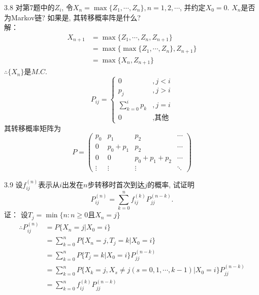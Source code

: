 3.8 对第7题中的$Z_i$, 令$X_n = \max \{Z_1, \cdots , Z_n\}, n = 1, 2, \cdots$, 并约定$X_0 = 0$. $X_n$是否为Markov链? 如果是, 其转移概率阵是什么?\\
解：\\
\begin{align*}
X_{n+1} & = \max \{Z_1, \cdots, Z_n, Z_{n+1}\}\\
		& = \max \{\max\{Z_1, \cdots, Z_n\}, Z_{n+1}\}\\
		& = \max \{X_n, Z_{n+1}\}
\end{align*}
$\therefore \{X_n\}$是$M.C.$\\
\[
P_{ij} = 
\begin{cases}
0 & , j < i\\
p_j & , j > i\\
\sum\limits^i_{k=0}p_k & , j = i\\
0 & , \text{其他}
\end{cases}
\]
其转移概率矩阵为
\[
P = 
\begin{pmatrix}
p_0 & p_1 & p_2 & \cdots \\
0 & p_0+p_1 & p_2 & \cdots \\
0 & 0 & p_0+p_1+p_2 & \cdots \\
\vdots & \vdots & \vdots & \ddots
\end{pmatrix}
\]


3.9 设$f^{(n)}_{ij}$表示从$i$出发在$n$步转移时首次到达$j$的概率, 试证明
\[
P^{(n)}_{ij} = \sum^n_{k=0}f^{(k)}_{ij}P^{(n-k)}_{jj}.
\]
证：
设$T_j = \min \{n: n \geqslant 0 \text{且} X_n = j\}$\\
\[
\begin{split}
\therefore P^{(n)}_{ij} & = P\{X_n = j | X_0 = i\}\\
				& = \sum^n_{k=0}P\{X_n = j, T_j = k | X_0 = i\}\\
				& = \sum^n_{k=0}P\{T_j = k | X_0 = i\}P^{(n-k)}_{jj}\\
				& = \sum^n_{k=0}P\{X_k = j, X_s\neq j(s = 0,1,\cdots, k-1) | X_0 = i\}P^{(n-k)}_{jj}\\
				& = \sum^n_{k=0}f^{(k)}_{ij} P^{(n-k)}_{jj}
\end{split}
\]


